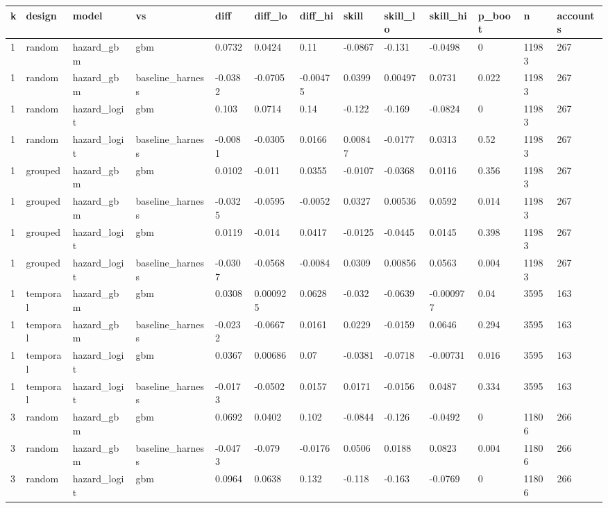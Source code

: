 \begin{tabular}{lllllllllllll}
\toprule
k & design & model & vs & diff & diff\_lo & diff\_hi & skill & skill\_lo & skill\_hi & p\_boot & n & accounts \\
\midrule
1 & random & hazard\_gbm & gbm & 0.0732 & 0.0424 & 0.11 & -0.0867 & -0.131 & -0.0498 & 0 & 11983 & 267 \\
1 & random & hazard\_gbm & baseline\_harness & -0.0382 & -0.0705 & -0.00475 & 0.0399 & 0.00497 & 0.0731 & 0.022 & 11983 & 267 \\
1 & random & hazard\_logit & gbm & 0.103 & 0.0714 & 0.14 & -0.122 & -0.169 & -0.0824 & 0 & 11983 & 267 \\
1 & random & hazard\_logit & baseline\_harness & -0.0081 & -0.0305 & 0.0166 & 0.00847 & -0.0177 & 0.0313 & 0.52 & 11983 & 267 \\
1 & grouped & hazard\_gbm & gbm & 0.0102 & -0.011 & 0.0355 & -0.0107 & -0.0368 & 0.0116 & 0.356 & 11983 & 267 \\
1 & grouped & hazard\_gbm & baseline\_harness & -0.0325 & -0.0595 & -0.0052 & 0.0327 & 0.00536 & 0.0592 & 0.014 & 11983 & 267 \\
1 & grouped & hazard\_logit & gbm & 0.0119 & -0.014 & 0.0417 & -0.0125 & -0.0445 & 0.0145 & 0.398 & 11983 & 267 \\
1 & grouped & hazard\_logit & baseline\_harness & -0.0307 & -0.0568 & -0.0084 & 0.0309 & 0.00856 & 0.0563 & 0.004 & 11983 & 267 \\
1 & temporal & hazard\_gbm & gbm & 0.0308 & 0.000925 & 0.0628 & -0.032 & -0.0639 & -0.000977 & 0.04 & 3595 & 163 \\
1 & temporal & hazard\_gbm & baseline\_harness & -0.0232 & -0.0667 & 0.0161 & 0.0229 & -0.0159 & 0.0646 & 0.294 & 3595 & 163 \\
1 & temporal & hazard\_logit & gbm & 0.0367 & 0.00686 & 0.07 & -0.0381 & -0.0718 & -0.00731 & 0.016 & 3595 & 163 \\
1 & temporal & hazard\_logit & baseline\_harness & -0.0173 & -0.0502 & 0.0157 & 0.0171 & -0.0156 & 0.0487 & 0.334 & 3595 & 163 \\
3 & random & hazard\_gbm & gbm & 0.0692 & 0.0402 & 0.102 & -0.0844 & -0.126 & -0.0492 & 0 & 11806 & 266 \\
3 & random & hazard\_gbm & baseline\_harness & -0.0473 & -0.079 & -0.0176 & 0.0506 & 0.0188 & 0.0823 & 0.004 & 11806 & 266 \\
3 & random & hazard\_logit & gbm & 0.0964 & 0.0638 & 0.132 & -0.118 & -0.163 & -0.0769 & 0 & 11806 & 266 \\

\end{tabular}
